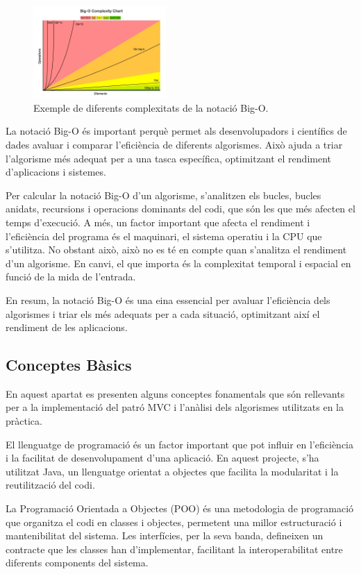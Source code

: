 \documentclass{ieeetj}
\begin{document}
\begin{figure}[htbp]
\centerline{\includegraphics[width=0.45\textwidth]{Cap1Matrius/docs/png/bigO.png}}
\caption{Exemple de diferents complexitats de la notació Big-O.}
\label{fig:big_o}
\end{figure}

La notació Big-O és important perquè permet als desenvolupadors i científics de dades avaluar i comparar l'eficiència de diferents algorismes. Això ajuda a triar l'algorisme més adequat per a una tasca específica, optimitzant el rendiment d'aplicacions i sistemes.

Per calcular la notació Big-O d'un algorisme, s'analitzen els bucles, bucles anidats, recursions i operacions dominants del codi, que són les que més afecten el temps d'execució. A més, un factor important que afecta el rendiment i l'eficiència del programa és el maquinari, el sistema operatiu i la CPU que s'utilitza. No obstant això, això no es té en compte quan s'analitza el rendiment d'un algorisme. En canvi, el que importa és la complexitat temporal i espacial en funció de la mida de l'entrada.

En resum, la notació Big-O és una eina essencial per avaluar l'eficiència dels algorismes i triar els més adequats per a cada situació, optimitzant així el rendiment de les aplicacions.

\subsection{Conceptes Bàsics}
En aquest apartat es presenten alguns conceptes fonamentals que són rellevants per a la implementació del patró MVC i l'anàlisi dels algorismes utilitzats en la pràctica.

El llenguatge de programació és un factor important que pot influir en l'eficiència i la facilitat de desenvolupament d'una aplicació. En aquest projecte, s'ha utilitzat Java, un llenguatge orientat a objectes que facilita la modularitat i la reutilització del codi.

La Programació Orientada a Objectes (POO) és una metodologia de programació que organitza el codi en classes i objectes, permetent una millor estructuració i mantenibilitat del sistema. Les interfícies, per la seva banda, defineixen un contracte que les classes han d'implementar, facilitant la interoperabilitat entre diferents components del sistema.
\end{document}
